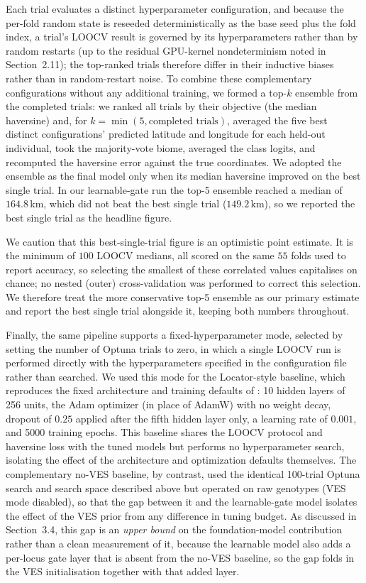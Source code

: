 \documentclass[twocolumn,10pt]{article}
\begin{document}
Each trial evaluates a distinct hyperparameter configuration, and because the per-fold random state
is reseeded deterministically as the base seed plus the fold index, a trial's LOOCV result is
governed by its hyperparameters rather than by random restarts (up to the residual GPU-kernel
nondeterminism noted in Section~2.11); the top-ranked trials therefore differ in their inductive
biases rather than in random-restart noise. To combine these complementary configurations without
any additional training, we formed a top-$k$ ensemble from the completed trials: we ranked all
trials by their objective (the median haversine) and, for $k=\min(5, \text{completed trials})$,
averaged the five best distinct configurations' predicted latitude and longitude for each held-out
individual, took the majority-vote biome, averaged the class logits, and recomputed the haversine
error against the true coordinates. We adopted the ensemble as the final model only when its median
haversine improved on the best single trial. In our learnable-gate run the top-5 ensemble reached a
median of $164.8$\,km, which did not beat the best single trial ($149.2$\,km), so we reported the
best single trial as the headline figure.

We caution that this best-single-trial figure is an optimistic point estimate. It is the minimum of
$100$ LOOCV medians, all scored on the same $55$ folds used to report accuracy, so selecting the
smallest of these correlated values capitalises on chance; no nested (outer) cross-validation was
performed to correct this selection. We therefore treat the more conservative top-5 ensemble as our
primary estimate and report the best single trial alongside it, keeping both numbers throughout.

Finally, the same pipeline supports a fixed-hyperparameter mode, selected by setting the number of
Optuna trials to zero, in which a single LOOCV run is performed directly with the hyperparameters
specified in the configuration file rather than searched. We used this mode for the Locator-style
baseline, which reproduces the fixed architecture and training defaults of
\citet{battey2020predicting}: 10 hidden layers of 256 units, the Adam optimizer
\citep{kingma2014adam} (in place of AdamW) with no weight decay, dropout of $0.25$ applied after the
fifth hidden layer only, a learning rate of $0.001$, and 5000 training epochs. This baseline shares
the LOOCV protocol and haversine loss with the tuned models but performs no hyperparameter search,
isolating the effect of the architecture and optimization defaults themselves. The complementary
no-VES baseline, by contrast, used the identical 100-trial Optuna search and search space described
above but operated on raw genotypes (VES mode disabled), so that the gap between it and the
learnable-gate model isolates the effect of the VES prior from any difference in tuning budget. As
discussed in Section~3.4, this gap is an \emph{upper bound} on the foundation-model contribution
rather than a clean measurement of it, because the learnable model also adds a per-locus gate layer
that is absent from the no-VES baseline, so the gap folds in the VES initialisation together with
that added layer.
\end{document}
